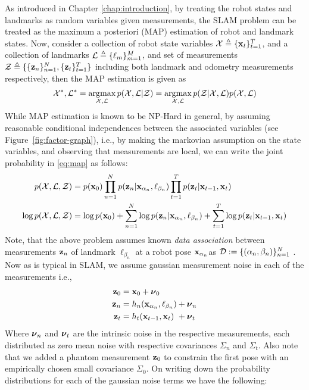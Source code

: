 As introduced in Chapter \ref{chap:introduction}, by treating the robot states and landmarks as random variables given measurements, the SLAM problem can be treated as the maximum a posteriori (MAP) estimation of robot and landmark states. Now, consider a collection of robot state variables $\mathcal{X} \triangleq \{ \mathbf{x}_t \}_{t=1}^{T}$, and a collection of landmarks $\mathcal{L} \triangleq \{ \ell_m \}_{m=1}^{M}$, and set of measurements $\mathcal{Z} \triangleq \{\{\mathbf{z}_n \}_{n=1}^{N}, \{\mathbf{z}_t\}_{t=1}^{T}\}$ including both landmark and odometry measurements respectively, then the MAP estimation is given as
\begin{align}
    \mathcal{X}^*, \mathcal{L}^* = \operatorname*{\arg\!\max}_{\mathcal{X}, \mathcal{L}} p(\mathcal{X}, \mathcal{L} | \mathcal{Z}) = \operatorname*{\arg\!\max}_{\mathcal{X}, \mathcal{L}} p(\mathcal{Z} | \mathcal{X}, \mathcal{L}) p(\mathcal{X}, \mathcal{L}) \label{eq:map}
\end{align}
While MAP estimation is known to be NP-Hard in general, by assuming reasonable conditional independences between the associated variables (see Figure~\ref{fig:factor-graph}), i.e., by making the markovian assumption on the state variables, and observing that measurements are local, we can write the joint probability in \ref{eq:map} as follows:
\begin{align}
    p(\mathcal{X}, \mathcal{L}, \mathcal{Z}) &= p(\mathbf{x}_0) \prod_{n=1}^{N} p(\mathbf{z}_n | \mathbf{x}_{\alpha_n}, \ell_{\beta_n}) \prod_{t=1}^{T} p(\mathbf{z}_t | \mathbf{x}_{t-1}, \mathbf{x}_{t})\nonumber\\
    \log p(\mathcal{X}, \mathcal{L}, \mathcal{Z}) &= \log p(\mathbf{x}_0) + \sum_{n=1}^{N} \log p(\mathbf{z}_n | \mathbf{x}_{\alpha_n}, \ell_{\beta_n}) + \sum_{t=1}^{T} \log p(\mathbf{z}_t | \mathbf{x}_{t-1}, \mathbf{x}_{t})
\end{align}
Note, that the above problem assumes known \emph{data association} between measurements $\mathbf{z}_n$ of landmark $\ell_{\beta_n}$ at a robot pose $\mathbf{x}_{\alpha_n}$as $\mathcal{D} := \{(\alpha_n, \beta_n)\}_{n=1}^{N}$ \cite{bowmanProbabilisticDataAssociation2017}.
Now as is typical in SLAM, we assume gaussian measurement noise in each of the measurements i.e.,
\begin{align}
    \mathbf{z}_0 &= \mathbf{x}_0 + \boldsymbol \nu_0\\
    \mathbf{z}_n &= h_n(\mathbf{x}_{\alpha_n}, \ell_{\beta_n}) + \boldsymbol \nu_n\\
    \mathbf{z}_t &= h_t(\mathbf{x}_{t-1}, \mathbf{x}_t) ~+ \boldsymbol \nu_t
\end{align}
Where $\boldsymbol \nu_n$ and $\boldsymbol \nu_t$ are the intrinsic noise in the respective measurements, each distributed as zero mean noise with respective covariances $\Sigma_n$ and $\Sigma_t$. Also note that we added a phantom measurement $\mathbf{z}_0$ to constrain the first pose with an empirically chosen small covariance $\Sigma_0$. On writing down the probability distributions for each of the gaussian noise terms we have the following:
